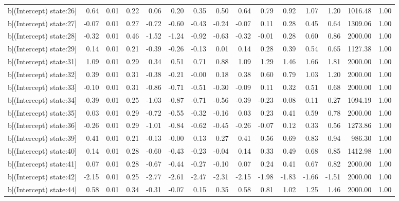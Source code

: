 \begin{table}[ht]
\begin{tabular}{rrrrrrrrrrrrrrr}
  b[(Intercept) state:26] & 0.64 & 0.01 & 0.22 & 0.06 & 0.20 & 0.35 & 0.50 & 0.64 & 0.79 & 0.92 & 1.07 & 1.20 & 1016.48 & 1.00 \\ 
  b[(Intercept) state:27] & -0.07 & 0.01 & 0.27 & -0.72 & -0.60 & -0.43 & -0.24 & -0.07 & 0.11 & 0.28 & 0.45 & 0.64 & 1309.06 & 1.00 \\ 
  b[(Intercept) state:28] & -0.32 & 0.01 & 0.46 & -1.52 & -1.24 & -0.92 & -0.63 & -0.32 & -0.01 & 0.28 & 0.60 & 0.86 & 2000.00 & 1.00 \\ 
  b[(Intercept) state:29] & 0.14 & 0.01 & 0.21 & -0.39 & -0.26 & -0.13 & 0.01 & 0.14 & 0.28 & 0.39 & 0.54 & 0.65 & 1127.38 & 1.00 \\ 
  b[(Intercept) state:31] & 1.09 & 0.01 & 0.29 & 0.34 & 0.51 & 0.71 & 0.88 & 1.09 & 1.29 & 1.46 & 1.66 & 1.81 & 2000.00 & 1.00 \\ 
  b[(Intercept) state:32] & 0.39 & 0.01 & 0.31 & -0.38 & -0.21 & -0.00 & 0.18 & 0.38 & 0.60 & 0.79 & 1.03 & 1.20 & 2000.00 & 1.00 \\ 
  b[(Intercept) state:33] & -0.10 & 0.01 & 0.31 & -0.86 & -0.71 & -0.51 & -0.30 & -0.09 & 0.11 & 0.32 & 0.51 & 0.68 & 2000.00 & 1.00 \\ 
  b[(Intercept) state:34] & -0.39 & 0.01 & 0.25 & -1.03 & -0.87 & -0.71 & -0.56 & -0.39 & -0.23 & -0.08 & 0.11 & 0.27 & 1094.19 & 1.00 \\ 
  b[(Intercept) state:35] & 0.03 & 0.01 & 0.29 & -0.72 & -0.55 & -0.32 & -0.16 & 0.03 & 0.23 & 0.41 & 0.59 & 0.78 & 2000.00 & 1.00 \\ 
  b[(Intercept) state:36] & -0.26 & 0.01 & 0.29 & -1.01 & -0.84 & -0.62 & -0.45 & -0.26 & -0.07 & 0.12 & 0.33 & 0.56 & 1273.86 & 1.00 \\ 
  b[(Intercept) state:39] & 0.41 & 0.01 & 0.21 & -0.13 & -0.00 & 0.13 & 0.27 & 0.41 & 0.56 & 0.69 & 0.83 & 0.94 & 986.30 & 1.00 \\ 
  b[(Intercept) state:40] & 0.14 & 0.01 & 0.28 & -0.60 & -0.43 & -0.23 & -0.04 & 0.14 & 0.33 & 0.49 & 0.68 & 0.85 & 1412.98 & 1.00 \\ 
  b[(Intercept) state:41] & 0.07 & 0.01 & 0.28 & -0.67 & -0.44 & -0.27 & -0.10 & 0.07 & 0.24 & 0.41 & 0.67 & 0.82 & 2000.00 & 1.00 \\ 
  b[(Intercept) state:42] & -2.15 & 0.01 & 0.25 & -2.77 & -2.61 & -2.47 & -2.31 & -2.15 & -1.98 & -1.83 & -1.66 & -1.51 & 2000.00 & 1.00 \\ 
  b[(Intercept) state:44] & 0.58 & 0.01 & 0.34 & -0.31 & -0.07 & 0.15 & 0.35 & 0.58 & 0.81 & 1.02 & 1.25 & 1.46 & 2000.00 & 1.00 \\ 

\end{tabular}
\end{table}
